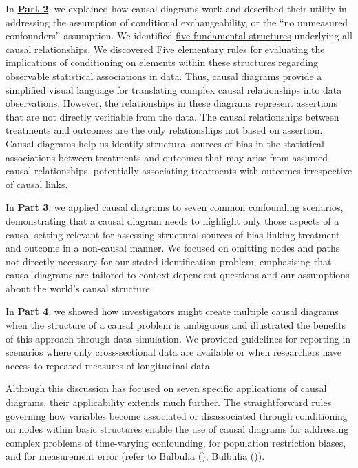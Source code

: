 \documentclass[
  singlecolumn]{article}
\begin{document}
In \hyperref[section-part2]{\textbf{Part 2}}, we explained how causal
diagrams work and described their utility in addressing the assumption
of conditional exchangeability, or the ``no unmeasured confounders''
assumption. We identified \hyperref[sec-five-elementary]{five
fundamental structures} underlying all causal relationships. We
discovered \hyperref[sec-four-rules]{Five elementary rules} for
evaluating the implications of conditioning on elements within these
structures regarding observable statistical associations in data. Thus,
causal diagrams provide a simplified visual language for translating
complex causal relationships into data observations. However, the
relationships in these diagrams represent assertions that are not
directly verifiable from the data. The causal relationships between
treatments and outcomes are the only relationships not based on
assertion. Causal diagrams help us identify structural sources of bias
in the statistical associations between treatments and outcomes that may
arise from assumed causal relationships, potentially associating
treatments with outcomes irrespective of causal links.

In \hyperref[section-part3]{\textbf{Part 3}}, we applied causal diagrams
to seven common confounding scenarios, demonstrating that a causal
diagram needs to highlight only those aspects of a causal setting
relevant for assessing structural sources of bias linking treatment and
outcome in a non-causal manner. We focused on omitting nodes and paths
not directly necessary for our stated identification problem,
emphasising that causal diagrams are tailored to context-dependent
questions and our assumptions about the world's causal structure.

In \hyperref[section-part4]{\textbf{Part 4}}, we showed how
investigators might create multiple causal diagrams when the structure
of a causal problem is ambiguous and illustrated the benefits of this
approach through data simulation. We provided guidelines for reporting
in scenarios where only cross-sectional data are available or when
researchers have access to repeated measures of longitudinal data.

Although this discussion has focused on seven specific applications of
causal diagrams, their applicability extends much further. The
straightforward rules governing how variables become associated or
disassociated through conditioning on nodes within basic structures
enable the use of causal diagrams for addressing complex problems of
time-varying confounding, for population restriction biases, and for
measurement error (refer to Bulbulia
(); Bulbulia
()).
\end{document}
